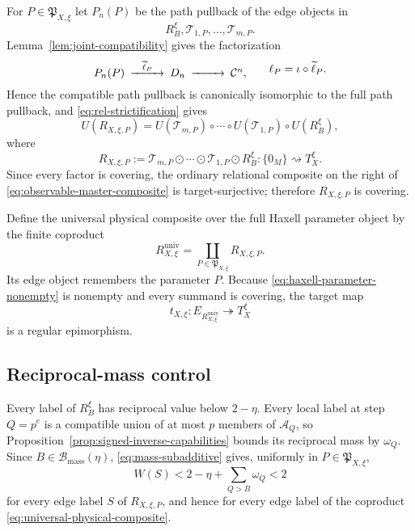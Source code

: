 For $P\in\mathfrak P_{X,\xi}$ let $P_n(P)$ be the path pullback of the edge objects in
\[
R_B^\xi,\mathscr T_{1,P},\ldots,\mathscr T_{m,P}.
\]
Lemma~\ref{lem:joint-compatibility} gives the factorization
\begin{equation}\label{eq:realization-factorization}
\begin{CD}
P_n(P) @>{\widetilde\ell_P}>> D_n @>>> \mathcal C^n,
\end{CD}
\qquad
\ell_P=\iota\circ\widetilde\ell_P.
\end{equation}
Hence the compatible path pullback is canonically isomorphic to the full path pullback, and \eqref{eq:rel-strictification} gives
\begin{equation}\label{eq:observable-master-composite}
U(R_{X,\xi,P})
=
U(\mathscr T_{m,P})\circ\cdots\circ
U(\mathscr T_{1,P})\circ U(R_B^\xi),
\end{equation}
where
\begin{equation}\label{eq:physical-master-composite}
R_{X,\xi,P}
:=
\mathscr T_{m,P}\odot\cdots\odot
\mathscr T_{1,P}\odot R_B^\xi
:\{0_M\}\rightsquigarrow T_X^\xi.
\end{equation}
Since every factor is covering, the ordinary relational composite on the right of \eqref{eq:observable-master-composite} is target-surjective; therefore $R_{X,\xi,P}$ is covering.

Define the universal physical composite over the full Haxell parameter object by the finite coproduct
\begin{equation}\label{eq:universal-physical-composite}
R_{X,\xi}^{\mathrm{univ}}
=
\coprod_{P\in\mathfrak P_{X,\xi}}R_{X,\xi,P}.
\end{equation}
Its edge object remembers the parameter $P$.  Because \eqref{eq:haxell-parameter-nonempty} is nonempty and every summand is covering, the target map
\begin{equation}\label{eq:universal-realization-epi}
t_{X,\xi}:E_{R_{X,\xi}^{\mathrm{univ}}}
\twoheadrightarrow T_X^\xi
\end{equation}
is a regular epimorphism.

\subsection{Reciprocal-mass control}

Every label of $R_B^\xi$ has reciprocal value below $2-\eta$.  Every local label at step $Q=p^e$ is a compatible union of at most $p$ members of $\mathcal A_Q$, so Proposition~\ref{prop:signed-inverse-capabilities} bounds its reciprocal mass by $\omega_Q$.  Since $B\in\mathcal B_{\mathrm{mass}}(\eta)$, \eqref{eq:mass-subadditive} gives, uniformly in $P\in\mathfrak P_{X,\xi}$,
\begin{equation}\label{eq:physical-W-less-2}
W(S)
<2-\eta+\sum_{Q>B}\omega_Q
<2
\end{equation}
for every edge label $S$ of $R_{X,\xi,P}$, and hence for every edge label of the coproduct \eqref{eq:universal-physical-composite}.


